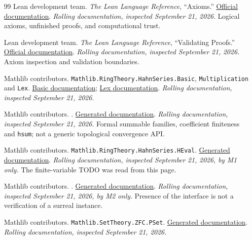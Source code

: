 \documentclass[11pt,letterpaper]{article}
\numberwithin{equation}{section}
\theoremstyle{definition}
\theoremstyle{remark}
\begin{document}
\begin{thebibliography}{99}
Lean development team. \emph{The Lean Language Reference}, ``Axioms.''
\href{https://lean-lang.org/doc/reference/latest/Axioms/}{Official documentation}.
\emph{Rolling documentation, inspected September 21, 2026.} Logical axioms,
unfinished proofs, and computational trust.

Lean development team. \emph{The Lean Language Reference}, ``Validating Proofs.''
\href{https://lean-lang.org/doc/reference/latest/ValidatingProofs/}{Official documentation}.
\emph{Rolling documentation, inspected September 21, 2026.} Axiom inspection and
validation boundaries.

Mathlib contributors. \texttt{Mathlib.RingTheory.HahnSeries.Basic},
\texttt{Multiplication} and \texttt{Lex}.
\href{https://leanprover-community.github.io/mathlib4_docs/Mathlib/RingTheory/HahnSeries/Basic.html}{Basic documentation};
\href{https://leanprover-community.github.io/mathlib4_docs/Mathlib/RingTheory/HahnSeries/Lex.html}{Lex documentation}.
\emph{Rolling documentation, inspected September 21, 2026.}

Mathlib contributors. .
\href{https://leanprover-community.github.io/mathlib4_docs/Mathlib/RingTheory/HahnSeries/Summable.html}{Generated documentation}.
\emph{Rolling documentation, inspected September 21, 2026.} Formal summable
families, coefficient finiteness and \texttt{hsum}; not a generic topological
convergence API.

Mathlib contributors. \texttt{Mathlib.RingTheory.HahnSeries.HEval}.
\href{https://leanprover-community.github.io/mathlib4_docs/Mathlib/RingTheory/HahnSeries/HEval.html}{Generated documentation}.
\emph{Rolling documentation, inspected September 21, 2026, by M1 only.} The
finite-variable  TODO was read from this page.

Mathlib contributors. .
\href{https://leanprover-community.github.io/mathlib4_docs/Mathlib/FieldTheory/IsRealClosed/Basic.html}{Generated documentation}.
\emph{Rolling documentation, inspected September 21, 2026, by M2 only.} Presence
of the interface is not a verification of a surreal instance.

Mathlib contributors. \texttt{Mathlib.SetTheory.ZFC.PSet}.
\href{https://leanprover-community.github.io/mathlib4_docs/Mathlib/SetTheory/ZFC/PSet.html}{Generated documentation}.
\emph{Rolling documentation, inspected September 21, 2026.}


\end{thebibliography}
\end{document}
